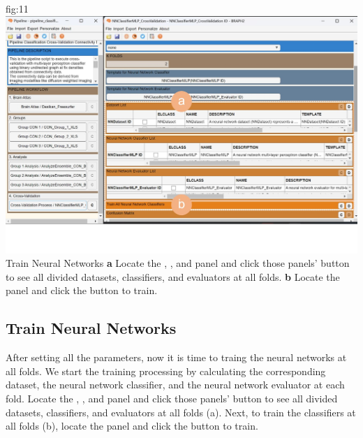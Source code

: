 \documentclass[justified]{tufte-handout}
\begin{document}
{
	{fig:11}
	{
	\includegraphics{fig11.jpg}
	}
	{Train Neural Networks}
	{
	{\bf a} Locate the , , and  panel and click those panels'  button to see all divided datasets, classifiers, and evaluators at all folds.
	{\bf b} Locate the  panel and click the  button to train.  
	}

\subsection{Train Neural Networks}

After setting all the parameters, now it is time to traing the neural networks at all folds. 
We start the training processing by calculating the corresponding dataset, the neural network classifier, and the neural network evaluator at each fold.
Locate the , , and  panel and click those panels'  button to see all divided datasets, classifiers, and evaluators at all folds (a).
Next, to train the classifiers at all folds (b), locate the  panel and click the  button to train. 

}
\end{document}
